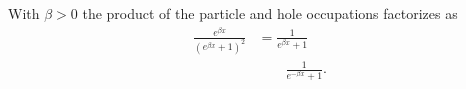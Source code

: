 \documentclass{article}
\begin{document}
With $\beta>0$ the product of the particle and hole occupations factorizes as
\begin{align}
\frac{e^{\beta x}}{\left(e^{\beta x}+1\right)^2} &= \frac{1}{e^{\beta x}+1} \nonumber\\
&\qquad \frac{1}{e^{-\beta x}+1} .
\label{eq:pp}
\end{align}
\end{document}
